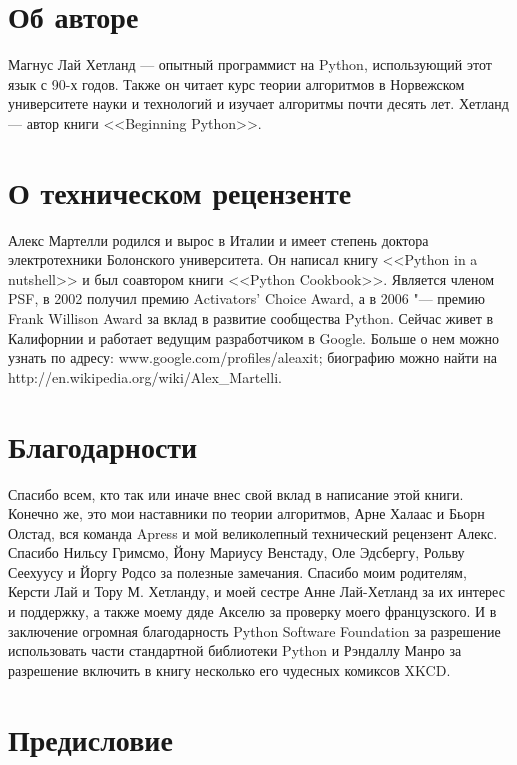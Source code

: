 \chapter*{Об авторе}

Магнус Лай Хетланд — опытный программист на Python, использующий этот язык с 90-х годов. Также он читает курс теории алгоритмов в Норвежском университете науки и технологий и изучает алгоритмы почти десять лет. Хетланд — автор книги <<Beginning Python>>.

\chapter*{О техническом рецензенте}

Алекс Мартелли родился и вырос в Италии и имеет степень доктора электротехники Болонского университета. Он написал книгу <<Python in a nutshell>> и был соавтором книги <<Python Cookbook>>. Является членом PSF, в 2002 получил премию Activators’ Choice Award, а в 2006 "--- премию Frank Willison Award за вклад в развитие сообщества Python. Сейчас живет в Калифорнии и работает ведущим разработчиком в Google. Больше о нем можно узнать по адресу: www.google.com/profiles/aleaxit; биографию можно найти на http://en.wikipedia.org/wiki/Alex\_Martelli.


\chapter*{Благодарности}

Спасибо всем, кто так или иначе внес свой вклад в написание этой книги. Конечно же, это мои наставники по теории алгоритмов, Арне Халаас и Бьорн Олстад, вся команда Apress и мой великолепный технический рецензент Алекс. Спасибо Нильсу Гримсмо, Йону Мариусу Венстаду, Оле Эдсбергу, Рольву Сеехуусу и Йоргу Родсо за полезные замечания. Спасибо моим родителям, Керсти Лай и Тору М. Хетланду, и моей сестре Анне Лай-Хетланд за их интерес и поддержку, а также моему дяде Акселю за проверку моего французского. И в заключение огромная благодарность Python Software Foundation за разрешение использовать части стандартной библиотеки Python и Рэндаллу Манро за разрешение включить в книгу несколько его чудесных комиксов XKCD.


\chapter*{Предисловие}

